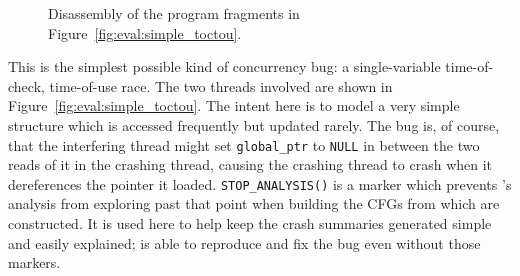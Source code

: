 \begin{figure}
  \hspace{-5mm}
  \caption{Disassembly of the program fragments in Figure~\ref{fig:eval:simple_toctou}.}
  \label{fig:eval:simple_toctou:compiled}
\end{figure}

This is the simplest possible kind of concurrency bug: a
single-variable time-of-check, time-of-use race.  The two threads
involved are shown in Figure~\ref{fig:eval:simple_toctou}.  The intent
here is to model a very simple structure which is accessed frequently
but updated rarely.  The bug is, of course, that the interfering
thread might set \texttt{global\_ptr} to \texttt{NULL} in between the
two reads of it in the crashing thread, causing the crashing thread to
crash when it dereferences the pointer it loaded.
\texttt{STOP\_ANALYSIS()} is a marker which prevents {\technique}'s
analysis from exploring past that point when building the CFGs from
which {\StateMachines} are constructed.  It is used here to help keep
the crash summaries generated simple and easily explained;
{\implementation} is able to reproduce and fix the bug even without
those markers.

